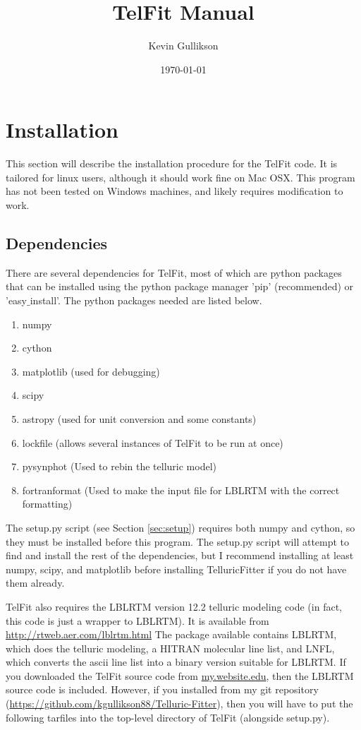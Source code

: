\documentclass{article}
\begin{document}
\title{TelFit Manual}
\author{Kevin Gullikson}
\date{\today}
\maketitle



\section{Installation}
\label{sec:installation}
This section will describe the installation procedure for the TelFit code. It is tailored for linux users, although it should work fine on Mac OSX. This program has not been tested on Windows machines, and likely requires modification to work.
\subsection{Dependencies}
There are several dependencies for TelFit, most of which are python packages that can be installed using the python package manager 'pip' (recommended) or 'easy$\_$install'. The python packages needed are listed below.
\begin{enumerate}
\item numpy
\item cython     
\item matplotlib (used for debugging)
\item scipy
\item astropy    (used for unit conversion and some constants)
\item lockfile   (allows several instances of TelFit to be run at once)
\item pysynphot  (Used to rebin the telluric model)
\item fortranformat (Used to make the input file for LBLRTM with the correct formatting)
\end{enumerate}
The setup.py script (see Section \ref{sec:setup}) requires both numpy and cython, so they must be installed before this program. The setup.py script will attempt to find and install the rest of the dependencies, but I recommend installing at least numpy, scipy, and matplotlib before installing TelluricFitter if you do not have them already.

TelFit also requires the LBLRTM version 12.2 telluric modeling code (in fact, this code is just a wrapper to LBLRTM). It is available from \url{http://rtweb.aer.com/lblrtm.html} The package available contains LBLRTM, which does the telluric modeling, a HITRAN molecular line list, and LNFL, which converts the ascii line list into a binary version suitable for LBLRTM. If you downloaded the TelFit source code from \url{my.website.edu}, then the LBLRTM source code is included. However, if you installed from my git repository (\url{https://github.com/kgullikson88/Telluric-Fitter}), then you will have to put the following tarfiles into the top-level directory of TelFit (alongside setup.py).
\end{document}
